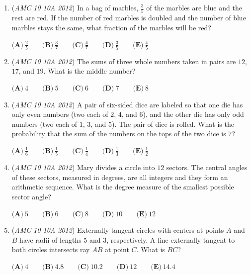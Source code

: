 \begin{enumerate}
 $\textbf{(A)}\ \frac{10}{3}\qquad\textbf{(B)}\ \frac{20}{3}\qquad\textbf{(C)}\ 7\qquad\textbf{(D)}\ \frac{15}{2}\qquad\textbf{(E)}\ 8$


	\item (\textit{AMC 10 10A 2012}) In a bag of marbles, $\frac{3}{5}$ of the marbles are blue and the rest are red. If the number of red marbles is doubled and the number of blue marbles stays the same, what fraction of the marbles will be red?


 $\textbf{(A)}\ \frac{2}{5}\qquad\textbf{(B)}\ \frac{3}{7}\qquad\textbf{(C)}\ \frac{4}{7}\qquad\textbf{(D)}\ \frac{3}{5}\qquad\textbf{(E)}\ \frac{4}{5}$


	\item (\textit{AMC 10 10A 2012}) The sums of three whole numbers taken in pairs are $12$, $17$, and $19$. What is the middle number?


 $\textbf{(A)}\ 4\qquad\textbf{(B)}\ 5\qquad\textbf{(C)}\ 6\qquad\textbf{(D)}\ 7\qquad\textbf{(E)}\ 8$


	\item (\textit{AMC 10 10A 2012}) A pair of six-sided dice are labeled so that one die has only even numbers (two each of $2$, $4$, and $6$), and the other die has only odd numbers (two each of $1$, $3$, and $5$). The pair of dice is rolled. What is the probability that the sum of the numbers on the tops of the two dice is $7$?


 $\textbf{(A)}\ \frac{1}{6}\qquad\textbf{(B)}\ \frac{1}{5}\qquad\textbf{(C)}\ \frac{1}{4}\qquad\textbf{(D)}\ \frac{1}{3}\qquad\textbf{(E)}\ \frac{1}{2}$


	\item (\textit{AMC 10 10A 2012}) Mary divides a circle into $12$ sectors. The central angles of these sectors, measured in degrees, are all integers and they form an arithmetic sequence. What is the degree measure of the smallest possible sector angle?


 $\textbf{(A)}\ 5\qquad\textbf{(B)}\ 6\qquad\textbf{(C)}\ 8\qquad\textbf{(D)}\ 10\qquad\textbf{(E)}\ 12$


	\item (\textit{AMC 10 10A 2012}) Externally tangent circles with centers at points $A$ and $B$ have radii of lengths $5$ and $3$, respectively. A line externally tangent to both circles intersects ray $AB$ at point $C$. What is $BC$?


 $\textbf{(A)}\ 4\qquad\textbf{(B)}\ 4.8\qquad\textbf{(C)}\ 10.2\qquad\textbf{(D)}\ 12\qquad\textbf{(E)}\ 14.4$



\end{enumerate}
